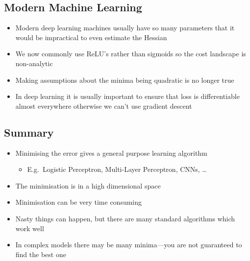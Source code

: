 \begin{slide}
\section{Modern Machine Learning}

\begin{PauseHighLight}
  \begin{itemize}
  \item Modern deep learning machines usually have so many parameters
    that it would be impractical to even estimate the Hessian\pause
  \item We now commonly use ReLU's rather than sigmoids so the cost
    landscape is non-analytic\pause
  \item Making assumptions about the minima being quadratic is no
    longer true\pause
  \item In deep learning it is usually important to ensure that loss
    is differentiable almost everywhere\pause{} otherwise we can't use
    gradient descent\pauseb
  \end{itemize}
\end{PauseHighLight}

\end{slide}


\begin{slide}
\section{Summary}

\begin{PauseHighLight}
\label{last}

\begin{itemize}
\item Minimising the error gives a general purpose learning algorithm
  \begin{itemize}
  \item E.g.\ Logistic Perceptron, Multi-Layer Perceptron, CNNs, \ldots\pause
  \end{itemize}
\item The minimisation is in a high dimensional space\pause
\item Minimisation can be very time consuming\pause
\item Nasty things can happen, but there are many standard algorithms which
  work well\pause
\item In complex models there may be many minima\pause---you are not
  guaranteed to find the best one\pause
\end{itemize}


\end{PauseHighLight}
\end{slide}



